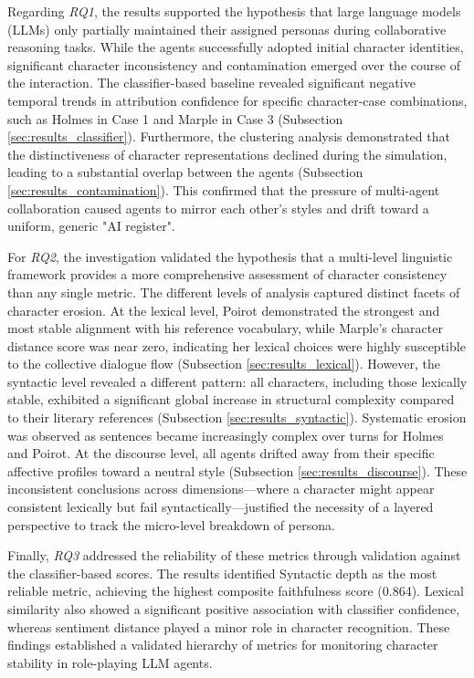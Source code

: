\documentclass{article}
\begin{document}
Regarding \emph{RQ1}, the results supported the hypothesis that large language models (LLMs) only partially maintained their assigned personas during collaborative reasoning tasks. While the agents successfully adopted initial character identities, significant character inconsistency and contamination emerged over the course of the interaction. The classifier-based baseline revealed significant negative temporal trends in attribution confidence for specific character-case combinations, such as Holmes in Case 1 and Marple in Case 3 (Subsection \ref{sec:results_classifier}). Furthermore, the clustering analysis demonstrated that the distinctiveness of character representations declined during the simulation, leading to a substantial overlap between the agents (Subsection \ref{sec:results_contamination}). This confirmed that the pressure of multi-agent collaboration caused agents to mirror each other's styles and drift toward a uniform, generic "AI register".

For \emph{RQ2}, the investigation validated the hypothesis that a multi-level linguistic framework provides a more comprehensive assessment of character consistency than any single metric. The different levels of analysis captured distinct facets of character erosion. At the lexical level, Poirot demonstrated the strongest and most stable alignment with his reference vocabulary, while Marple's character distance score was near zero, indicating her lexical choices were highly susceptible to the collective dialogue flow (Subsection \ref{sec:results_lexical}). However, the syntactic level revealed a different pattern: all characters, including those lexically stable, exhibited a significant global increase in structural complexity compared to their literary references
(Subsection \ref{sec:results_syntactic}). Systematic erosion was observed as sentences became increasingly complex over turns for Holmes and Poirot. At the discourse level, all agents drifted away from their specific affective profiles toward a neutral style (Subsection \ref{sec:results_discourse}). These inconsistent conclusions across dimensions—where a character might appear consistent lexically but fail syntactically—justified the necessity of a layered perspective to track the micro-level breakdown of persona.

Finally, \emph{RQ3} addressed the reliability of these metrics through validation against the classifier-based scores. The results identified Syntactic depth as the most reliable metric, achieving the highest composite faithfulness score (0.864). Lexical similarity also showed a significant positive association with classifier confidence, whereas sentiment distance played a minor role in character recognition. These findings established a validated hierarchy of metrics for monitoring character stability in role-playing LLM agents.
\end{document}
